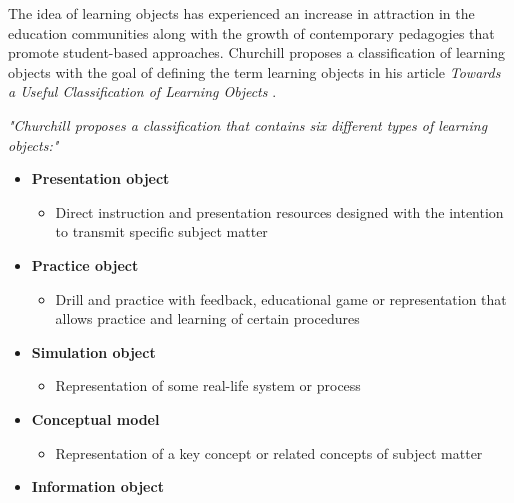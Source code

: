 The idea of learning objects has experienced an increase in attraction in the education communities along with the growth of contemporary pedagogies that promote student-based approaches. Churchill proposes a classification of learning objects with the goal of defining the term learning objects in his article \textit{Towards a Useful Classification of Learning Objects} \cite[p. 2]{Churchill2006}.

\begin{kasse} 
\textit{"Churchill proposes a classification that contains six different types of learning objects:"} \cite[p. 2]{Churchill2006}
\begin{itemize}
    \setlength\itemsep{0.05em}	
  \item \textbf{Presentation object}
      \vspace{-4mm}
      \begin{itemize}
          \item Direct instruction and presentation resources designed with the intention to transmit specific subject matter
    \end{itemize}
    \vspace{-3mm}
  \item \textbf{Practice object}
    \vspace{-4mm}
    \begin{itemize}
          \item Drill and practice with feedback, educational game or representation that allows practice and learning of certain procedures
      \end{itemize}
      \vspace{-3mm}
  \item \textbf{Simulation object}
      \vspace{-4mm}
      \begin{itemize}
          \item Representation of some real-life system or process
    \end{itemize}
    \vspace{-3mm}
  \item \textbf{Conceptual model}    
      \vspace{-4mm}
      \begin{itemize}
          \item Representation of a key concept or related concepts of subject matter
    \end{itemize}
    \vspace{-3mm}
  \item \textbf{Information object}

\end{itemize}
\end{kasse}
